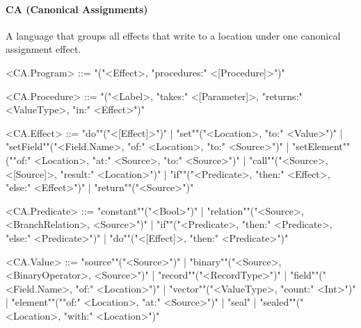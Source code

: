 \documentclass[main.tex]{subfiles}
\begin{document}
\paragraph{ CA (Canonical Assignments) } A language that groups all effects that write to a location under one canonical assignment effect.
\begin{grammar}
	\footnotesize
				<CA.Program> ::=
							"("<Effect>, "procedures:" <[Procedure]>")"
				\par
				<CA.Procedure> ::=
							"("<Label>, "takes:" <[Parameter]>, "returns:" <ValueType>, "in:" <Effect>")"
				\par
				<CA.Effect> ::=
						"do""("<[Effect]>")"
						| "set""("<Location>, "to:" <Value>")"
						| "setField""("<Field.Name>, "of:" <Location>, "to:" <Source>")"
						| "setElement""(""of:" <Location>, "at:" <Source>, "to:" <Source>")"
						| "call""("<Source>, <[Source]>, "result:" <Location>")"
						| "if""("<Predicate>, "then:" <Effect>, "else:" <Effect>")"
						| "return""("<Source>")"
				\par
				<CA.Predicate> ::=
						"constant""("<Bool>")"
						| "relation""("<Source>, <BranchRelation>, <Source>")"
						| "if""("<Predicate>, "then:" <Predicate>, "else:" <Predicate>")"
						| "do""("<[Effect]>, "then:" <Predicate>")"
				\par
				<CA.Value> ::=
						"source""("<Source>")"
						| "binary""("<Source>, <BinaryOperator>, <Source>")"
						| "record""("<RecordType>")"
						| "field""("<Field.Name>, "of:" <Location>")"
						| "vector""("<ValueType>, "count:" <Int>")"
						| "element""(""of:" <Location>, "at:" <Source>")"
						| "seal"
						| "sealed""("<Location>, "with:" <Location>")"
				\par
\end{grammar}
\par
\end{document}

